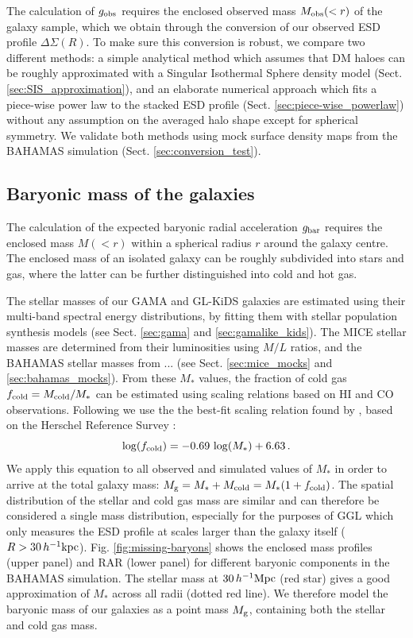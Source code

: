 \documentclass[usenatbib]{mnras}
\newcommand{\hkpc}{\, h^{-1}{\rm{kpc}} }
\newcommand{\hMpc}{\, h^{-1}{\rm{Mpc}} }
\newcommand{\un}[1]{_{\rm #1}}
\begin{document}
The calculation of $g\un{obs}$ requires the enclosed observed mass $M\un{obs}(<r)$ of the galaxy sample, which we obtain through the conversion of our observed ESD profile \mbox{$\Delta\Sigma(R)$}. To make sure this conversion is robust, we compare two different methods: a simple analytical method which assumes that DM haloes can be roughly approximated with a Singular Isothermal Sphere density model (Sect. \ref{sec:SIS_approximation}), and an elaborate numerical approach which fits a piece-wise power law to the stacked ESD profile (Sect. \ref{sec:piece-wise_powerlaw}) without any assumption on the averaged halo shape except for spherical symmetry. We validate both methods using mock surface density maps from the BAHAMAS simulation (Sect. \ref{sec:conversion_test}).

\subsection{Baryonic mass of the galaxies}
\label{sec:baryonic_mass}


The calculation of the expected baryonic radial acceleration $g\un{bar}$ requires the enclosed mass $M(<r)$ within a spherical radius $r$ around the galaxy centre. The enclosed mass of an isolated galaxy can be roughly subdivided into stars and gas, where the latter can be further distinguished into cold and hot gas.

The stellar masses of our GAMA and GL-KiDS galaxies are estimated using their multi-band spectral energy distributions, by fitting them with stellar population synthesis models (see Sect. \ref{sec:gama} and \ref{sec:gamalike_kids}). The MICE stellar masses are determined from their luminosities using $M/L$ ratios, and the BAHAMAS stellar masses from ... (see Sect. \ref{sec:mice_mocks} and \ref{sec:bahamas_mocks}). From these $M_*$ values, the fraction of cold gas $f\un{cold} = M\un{cold}/M_*$ can be estimated using scaling relations based on HI and CO observations. Following \cite{brouwer2016} we use the the best-fit scaling relation found by \cite{boselli2014}, based on the  Herschel Reference Survey \cite[]{boselli2010}:
\begin{equation}\label{eq:fcold}
	\log(f\un{cold}) = -0.69 \, \log(M_*) + 6.63 \, .
\end{equation}
We apply this equation to all observed and simulated values of $M_*$ in order to arrive at the total galaxy mass: $M\un{g} = M_* + M\un{cold} = M_* (1 + f\un{cold})$. The spatial distribution of the stellar and cold gas mass are similar \cite[]{pohlen2010,crocker2011,cooper2012,davis2013} and can therefore be considered a single mass distribution, especially for the purposes of GGL which only measures the ESD profile at scales larger than the galaxy itself ($R>30\hkpc$). Fig. \ref{fig:missing-baryons} shows the enclosed mass profiles (upper panel) and RAR (lower panel) for different baryonic components in the BAHAMAS simulation. The stellar mass at $30 \hMpc$ (red star) gives a good approximation of $M_*$ across all radii (dotted red line). We therefore model the baryonic mass of our galaxies as a point mass $M\un{g}$, containing both the stellar and cold gas mass.
\end{document}
